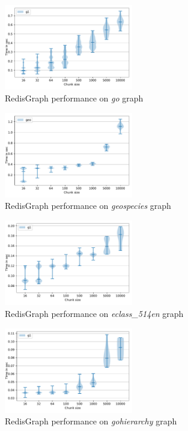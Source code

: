 \begin{figure}[h]
\centering
\includegraphics[width=0.5\textwidth]{data/raw_redis/go.pdf}
\caption{RedisGraph performance on \textit{go} graph}
\label{fig:redis_go_all}
\end{figure}

\begin{figure}[h]
\centering
\includegraphics[width=0.5\textwidth]{data/raw_redis/geospecies.pdf}
\caption{RedisGraph performance on \textit{geospecies} graph}
\label{fig:redis_geospecies_all}
\end{figure}

\begin{figure}[h]
\centering
\includegraphics[width=0.5\textwidth]{data/raw_redis/eclass_514en.pdf}
\caption{RedisGraph performance on \textit{eclass\_514en} graph}
\label{fig:redis_eclass_all}
\end{figure}

\begin{figure}[h]
\centering
\includegraphics[width=0.5\textwidth]{data/raw_redis/gohierarchy.pdf}
\caption{RedisGraph performance on \textit{gohierarchy} graph}
\label{fig:redis_gohierarchy_all}
\end{figure}

